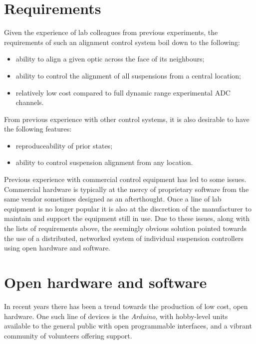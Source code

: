 \section{Requirements}
Given the experience of lab colleagues from previous experiments, the requirements of such an alignment control system boil down to the following:
\begin{itemize}
 \item ability to align a given optic across the face of its neighbours;
 \item ability to control the alignment of all suspensions from a central location;
 \item relatively low cost compared to full dynamic range experimental ADC channels.
\end{itemize}
From previous experience with other control systems, it is also desirable to have the following features:
\begin{itemize}
 \item reproduceability of prior states;
 \item ability to control suspension alignment from any location.
\end{itemize}
Previous experience with commercial control equipment has led to some issues. Commercial hardware is typically at the mercy of proprietary software from the same vendor sometimes designed as an afterthought. Once a line of lab equipment is no longer popular it is also at the discretion of the manufacturer to maintain and support the equipment still in use. Due to these issues, along with the lists of requirements above, the seemingly obvious solution pointed towards the use of a distributed, networked system of individual suspension controllers using open hardware and software.

\section{Open hardware and software}
In recent years there has been a trend towards the production of low cost, open hardware. One such line of devices is the \emph{Arduino}, with hobby-level units available to the general public with open programmable interfaces, and a vibrant community of volunteers offering support.
